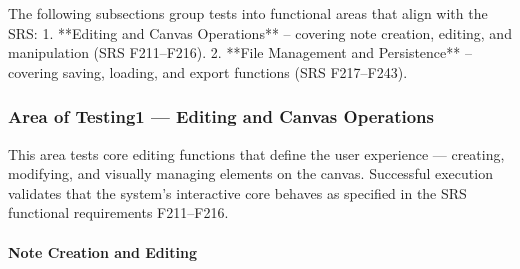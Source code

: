 \documentclass[12pt, titlepage]{article}
\begin{document}


The following subsections group tests into functional areas that align with the SRS:  
1. **Editing and Canvas Operations** – covering note creation, editing, and manipulation (SRS F211–F216).  
2. **File Management and Persistence** – covering saving, loading, and export functions (SRS F217–F243).  

\subsubsection{Area of Testing1 — Editing and Canvas Operations}


This area tests core editing functions that define the user experience — creating, modifying, and visually 
managing elements on the canvas. Successful execution validates that the system’s interactive core behaves 
as specified in the SRS functional requirements F211–F216.

\paragraph{Note Creation and Editing}
\end{document}
